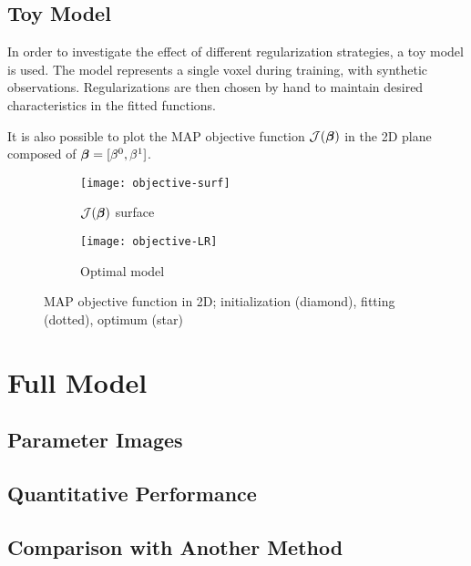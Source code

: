 \subsection{Toy Model}\label{ss:toyreg}
In order to investigate the effect of different regularization strategies, a toy model is used. The model represents a single voxel during training, with synthetic observations. Regularizations are then chosen by hand to maintain desired characteristics in the fitted functions. 

\par
It is also possible to plot the MAP objective function $\mathcal{J}(\bm{\beta})$ in the 2D plane composed of $\bm{\beta} = [\beta^0,\beta^1]$.
\begin{figure}
  \centering
  \begin{subfigure}{\plotwidth}\centering\texttt{[image: objective-surf]}\caption{$\mathcal{J}(\bm{\beta})$ surface}\label{fig:obj-surf}\end{subfigure}
  \begin{subfigure}{\plotwidth}\centering\texttt{[image: objective-LR]}  \caption{Optimal model}\label{fig:obj-lr}\end{subfigure}
  \caption{MAP objective function in 2D; initialization (diamond), fitting (dotted), optimum (star)}
\end{figure}

\section{Full Model}
\subsection{Parameter Images}
\subsection{Quantitative Performance}
\subsection{Comparison with Another Method}

